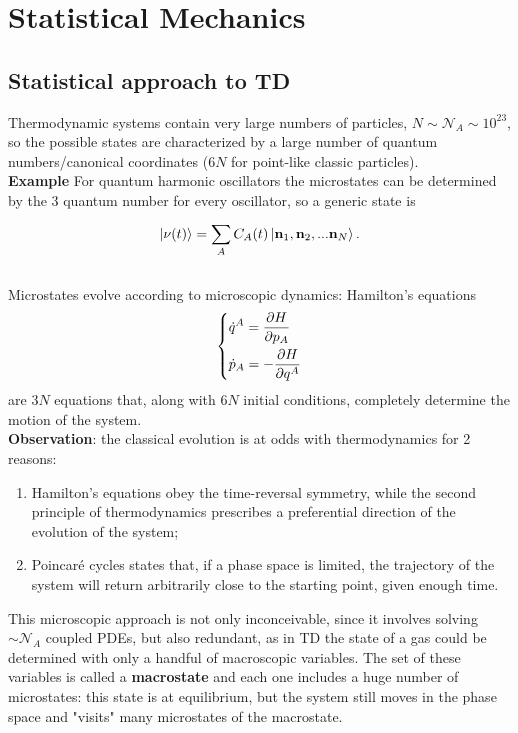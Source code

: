 \chapter{Statistical Mechanics}
\section{Statistical approach to TD}
Thermodynamic systems contain very large numbers of particles, $N\sim\mathcal{N}_A\sim
10^{23}$, so the possible states are characterized by a large number of quantum
numbers/canonical coordinates ($6N$ for point-like classic particles).\\
\textbf{Example} For quantum harmonic oscillators the microstates can be determined
by the $3$ quantum number for every oscillator, so a generic state is
$$\ket{\nu(t)}=\sum_{A}^{}C_A(t)\ket{\mathbf{n}_1,\mathbf{n}_2,...\mathbf{n}_N}.$$\\

Microstates evolve according to microscopic dynamics: Hamilton's equations
$$\begin{dcases*}
\dot q^A = \pdv{H}{p_A}\\
\dot p_A = -\pdv{H}{q^A}
\end{dcases*}
$$
are $3N$ equations that, along with $6N$ initial conditions, completely determine the
motion of the system.\\
\textbf{Observation}: the classical evolution is at odds with thermodynamics for 2
reasons:
\begin{enumerate}
    \item Hamilton's equations obey the time-reversal symmetry, while the second
        principle of thermodynamics prescribes a preferential direction of the
        evolution of the system;
    \item Poincaré cycles states that, if a phase space is limited, the trajectory
        of the system will return arbitrarily close to the starting point, given
        enough time.\\
\end{enumerate}

This microscopic approach is not only inconceivable, since it involves solving
$\sim\mathcal{N}_A$ coupled PDEs, but also redundant, as in TD the state of a gas
could be determined with only a handful of macroscopic variables. The set of these
variables is called a \textbf{macrostate} and each one includes a huge number of
microstates: this state is at equilibrium, but the system still moves in the phase
space and "visits" many microstates of the macrostate.\\

